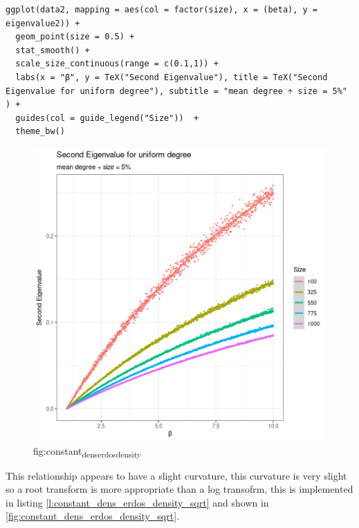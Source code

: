 \documentclass[11pt]{article}
\begin{document}
\begin{listing}[htbp]
\begin{verbatim}
ggplot(data2, mapping = aes(col = factor(size), x = (beta), y = eigenvalue2)) +
  geom_point(size = 0.5) +
  stat_smooth() +
  scale_size_continuous(range = c(0.1,1)) +
  labs(x = "β", y = TeX("Second Eigenvalue"), title = TeX("Second Eigenvalue for uniform degree"), subtitle = "mean degree ÷ size = 5%" ) +
  guides(col = guide_legend("Size"))  +
  theme_bw()
\end{verbatim}
\caption{\label{constant_dens_erdos_density}listing:constant\textsubscript{size}\textsubscript{erdos}\textsubscript{density}}
\end{listing}


\begin{figure}[htbp]
\centering
\includegraphics[width=12cm]{media/constant_dens_erdos_density.png}
\caption{\label{fig:constant_dens_erdos_density}fig:constant\textsubscript{dens}\textsubscript{erdos}\textsubscript{density}}
\end{figure}

This relationship appears to have a slight curvature, this curvature is very slight so a root transform is more appropriate than a log transofrm, this is implemented in listing \ref{l:constant_dens_erdos_density_sqrt}  and shown in \ref{fig:constant_dens_erdos_density_sqrt}.
\end{document}
